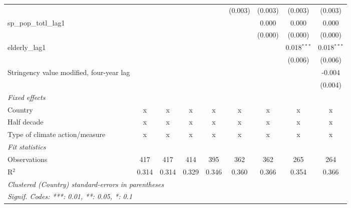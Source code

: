 \begin{tabular}{lcccccccc}
                                                                   &              &              &              &              & (0.003)      & (0.003)      & (0.003)       & (0.003)\\   
   sp\_pop\_totl\_lag1                                             &              &              &              &              &              & 0.000        & 0.000         & 0.000\\   
                                                                   &              &              &              &              &              & (0.000)      & (0.000)       & (0.000)\\   
   elderly\_lag1                                                   &              &              &              &              &              &              & 0.018$^{***}$ & 0.018$^{***}$\\   
                                                                   &              &              &              &              &              &              & (0.006)       & (0.006)\\   
   Stringency value modified, four-year lag                        &              &              &              &              &              &              &               & -0.004\\   
                                                                   &              &              &              &              &              &              &               & (0.004)\\   
   \emph{Fixed effects}\\
   Country                                                         & x            & x            & x            & x            & x            & x            & x             & x\\  
   Half decade                                                     & x            & x            & x            & x            & x            & x            & x             & x\\  
   Type of climate action/measure                                  & x            & x            & x            & x            & x            & x            & x             & x\\  
   \midrule \emph{Fit statistics}\\
   Observations                                                    & 417          & 417          & 414          & 395          & 362          & 362          & 265           & 264\\  
   R$^2$                                                           & 0.314        & 0.314        & 0.329        & 0.346        & 0.360        & 0.366        & 0.354         & 0.366\\  
   \midrule
   \multicolumn{9}{l}{\emph{Clustered (Country) standard-errors in parentheses}}\\
   \multicolumn{9}{l}{\emph{Signif. Codes: ***: 0.01, **: 0.05, *: 0.1}}\\
\end{tabular}
\par\endgroup


